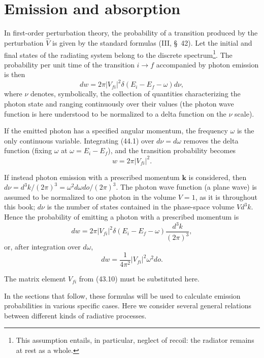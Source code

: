 \section{Emission and absorption}

In first-order perturbation theory, the probability of a transition produced by the perturbation $\widehat V$ is given by the standard formulas (III, \S~42). Let the initial and final states of the radiating system belong to the discrete spectrum\footnote{This assumption entails, in particular, neglect of recoil: the radiator remains at rest as a whole.}. The probability per unit time of the transition $i\to f$ accompanied by photon emission is then
\begin{equation}
dw=2\pi|V_{fi}|^2\delta(E_i-E_f-\omega)d\nu,
\tag{44.1}
\end{equation}
where $\nu$ denotes, symbolically, the collection of quantities characterizing the photon state and ranging continuously over their values (the photon wave function is here understood to be normalized to a delta function on the $\nu$ scale).

If the emitted photon has a specified angular momentum, the frequency $\omega$ is the only continuous variable. Integrating (44.1) over $d\nu=d\omega$ removes the delta function (fixing $\omega$ at $\omega=E_i-E_f$), and the transition probability becomes
\begin{equation}
w=2\pi|V_{fi}|^2.
\tag{44.2}
\end{equation}

If instead photon emission with a prescribed momentum $\mathbf k$ is considered, then $d\nu=d^3k/(2\pi)^3=\omega^2d\omega do/(2\pi)^3$. The photon wave function (a plane wave) is assumed to be normalized to one photon in the volume $V=1$, as it is throughout this book; $d\nu$ is the number of states contained in the phase-space volume $Vd^3k$. Hence the probability of emitting a photon with a prescribed momentum is
\begin{equation}
dw=2\pi|V_{fi}|^2\delta(E_i-E_f-\omega)\frac{d^3k}{(2\pi)^3},
\tag{44.3}
\end{equation}
or, after integration over $d\omega$,
\begin{equation}
dw=\frac{1}{4\pi^2}|V_{fi}|^2\omega^2do.
\tag{44.4}
\end{equation}

The matrix element $V_{fi}$ from (43.10) must be substituted here.

In the sections that follow, these formulas will be used to calculate emission probabilities in various specific cases. Here we consider several general relations between different kinds of radiative processes.

